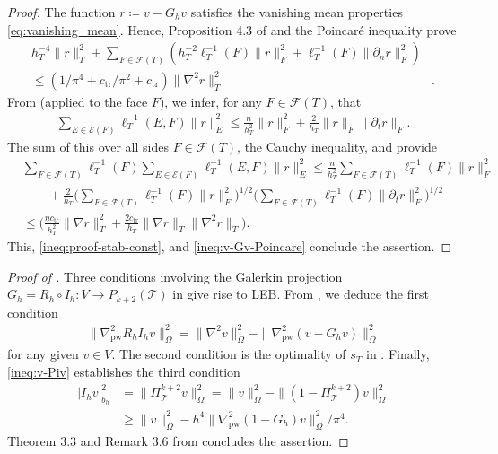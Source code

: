 \documentclass[a4paper]{amsart}
\numberwithin{equation}{section}
\def\F{\mathcal{F}}
\def\E{\mathcal{E}}
\def\T{\mathcal{T}}
\def\pw{\mathrm{pw}}
\theoremstyle{definition}
\theoremstyle{remark}
\numberwithin{theorem}{section}
\numberwithin{equation}{section}
\numberwithin{table}{section}
\numberwithin{figure}{section}
\begin{document}
\begin{proof}
    The function $r \coloneqq v - G_h v$ satisfies the vanishing mean properties \eqref{eq:vanishing_mean}. Hence, Proposition 4.3 of \cite{CarstensenZhaiZhang2020} and the Poincar\'e inequality prove
    \begin{align}\label{ineq:proof-stab-const}
        h_T^{-4} \|r\|^2_T + \sum_{F \in \mathcal{F}(T)} (h_T^{-2} \ell_T^{-1}(F) \|r\|_F^2 + \ell_T^{-1}(F) \|\partial_n r\|_F^2)&\nonumber\\
        \leq (1/\pi^4 + c_\mathrm{tr}/\pi^2 + c_\mathrm{tr})\|\nabla^2 r\|_T^2&.
    \end{align}
    From \cite[Ineq.~(4.1)]{CarstensenZhaiZhang2020} (applied to the face $F$), we infer, for any $F \in \F(T)$, that
    \begin{align*}
        \sum_{E \in \E(F)} \ell_T^{-1}(E,F) \|r\|_E^2 \leq \frac{n}{h_T^2}\|r\|^2_F + \frac{2}{h_T}\|r\|_F\|\partial_t r\|_F.
    \end{align*}
    The sum of this over all sides $F \in \F(T)$, the Cauchy inequality, and \cite[Proposition 4.3]{CarstensenZhaiZhang2020} provide
    \begin{align*}
        &\sum_{F \in \mathcal{F}(T)}\ell_T^{-1}(F)\sum_{E \in \E(F)} \ell_T^{-1}(E,F) \|r\|_E^2 \leq \frac{n}{h_T^2}\sum_{F \in \F(T)} \ell_T^{-1}(F) \|r\|_F^2\\
        &\qquad + \frac{2}{h_T}\big(\sum_{F \in \F(T)} \ell_T^{-1}(F) \|r\|_F^2\big)^{1/2}\big(\sum_{F \in \F(T)} \ell_T^{-1}(F) \|\partial_t r\|_F^2\big)^{1/2}\\
        & \leq \big(\frac{n c_\mathrm{tr}}{h_T^2}\|\nabla r\|_T^2 + \frac{2c_\mathrm{tr}}{h_T}\|\nabla r\|_T\|\nabla^2 r\|_T\big).
    \end{align*}
    This, \eqref{ineq:proof-stab-const}, and \eqref{ineq:v-Gv-Poincare} conclude the assertion.
\end{proof}

\begin{proof}[Proof of ]
    Three conditions involving the Galerkin projection $G_h = R_h \circ I_h : V \to P_{k+2}(\T)$ in \cite{Tran2024x2} give rise to LEB.
    From , we deduce the first condition
    \begin{align*}
        \|\nabla_\pw^2 R_h I_h v\|^2_\Omega = \|\nabla^2 v\|_\Omega^2 - \|\nabla_\pw^2(v - G_h v)\|^2_\Omega
    \end{align*}
    for any given $v \in V$.
    The second condition is the optimality of $s_T$ in .
    Finally, \eqref{ineq:v-Piv} establishes the third condition
    \begin{align*}
        |I_h v|_{b_h}^2 &= \|\Pi_\T^{k+2} v\|_\Omega^2 = \|v\|_\Omega^2 - \|(1 - \Pi_\T^{k+2})v\|_\Omega^2\\ &\geq \|v\|_\Omega^2 - h^4\|\nabla_\pw^2(1 - G_h) v\|_\Omega^2/\pi^4.
    \end{align*}
    Theorem 3.3 and Remark 3.6 from \cite{Tran2024x2} concludes the assertion.
\end{proof}
\end{document}
